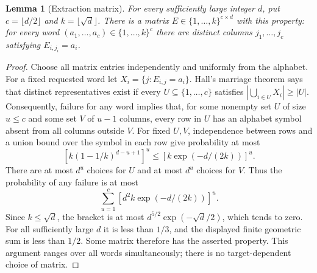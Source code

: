 \documentclass[11pt]{article}
\newtheorem{lemma}[theorem]{Lemma}
\newcommand{\1}{\mathbf 1}
\begin{document}
\begin{lemma}[Extraction matrix]
For every sufficiently large integer $d$, put $c=\lfloor d/2\rfloor$ and
$k=\lfloor\sqrt d\rfloor$. There is a matrix
$E\in\{1,\ldots,k\}^{c\times d}$ with this property: for every word
$(a_1,\ldots,a_c)\in\{1,\ldots,k\}^c$ there are distinct columns
$j_1,\ldots,j_c$ satisfying $E_{i,j_i}=a_i$.
\end{lemma}
\begin{proof}
Choose all matrix entries independently and uniformly from the alphabet.
For a fixed requested word let
$X_i=\{j:E_{i,j}=a_i\}$. Hall's marriage theorem says that distinct
representatives exist if every $U\subseteq\{1,\ldots,c\}$ satisfies
$|\bigcup_{i\in U}X_i|\geq |U|$.
Consequently, failure for any word implies that, for some nonempty set
$U$ of size $u\leq c$ and some set $V$ of $u-1$ columns, every row in $U$
has an alphabet symbol absent from all columns outside $V$.
For fixed $U,V$, independence between rows and a union bound over the symbol
in each row give probability at most
\[
 \left[k(1-1/k)^{d-u+1}\right]^u
 \leq \left[k\exp(-d/(2k))\right]^u.
\]
There are at most $d^u$ choices for $U$ and at most $d^u$ choices for $V$.
Thus the probability of any failure is at most
\[
 \sum_{u=1}^c\left[d^2k\exp(-d/(2k))\right]^u.
\]
Since $k\leq\sqrt d$, the bracket is at most
$d^{5/2}\exp(-\sqrt d/2)$, which tends to zero.
For all sufficiently large $d$ it is less than $1/3$, and the displayed
finite geometric sum is less than $1/2$. Some matrix therefore has the
asserted property. This argument ranges over all words simultaneously;
there is no target-dependent choice of matrix.
\end{proof}
\end{document}
